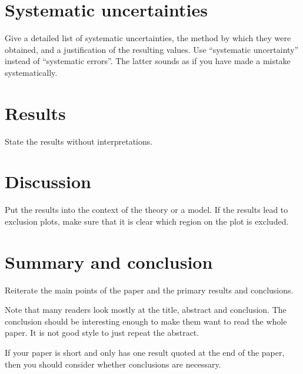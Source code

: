 \documentclass[UKenglish]{style/atlasdoc}
\begin{document}
\section{Systematic uncertainties}
\label{sec:syst}

Give a detailed list of systematic uncertainties, the method
by which they were obtained, and a justification of the resulting
values.
%
Use ``systematic uncertainty'' instead of ``systematic errors''.
The latter sounds as if you have made a mistake systematically.


\section{Results}
\label{sec:result}

State the results without interpretations.


\section{Discussion}
\label{sec:discussion}

Put the results into the context of the theory or a model.
%
If the results lead to exclusion plots, make sure that it is clear 
which region on the plot is excluded.


\section{Summary and conclusion}
\label{sec:summary}

Reiterate the main points of the paper and the primary results and
conclusions.

Note that many readers look mostly at the title, abstract and
conclusion. The conclusion should be interesting enough to
make them want to read the whole paper.
It is not good style to just repeat the abstract.

If your paper is short and only has one result quoted at the end of
the paper, then you should consider whether conclusions are
necessary. 
\end{document}
